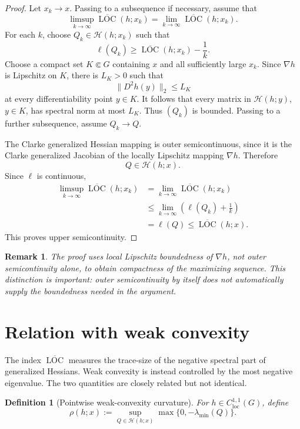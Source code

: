 \documentclass[11pt]{article}
\numberwithin{equation}{section}
\newtheorem{definition}[theorem]{Definition}
\newtheorem{remark}[theorem]{Remark}
\newcommand{\Hess}{\mathcal H}
\newcommand{\LOC}{\operatorname{LOC}}
\begin{document}
	\begin{proof}
		Let \(x_k\to x\). Passing to a subsequence if necessary, assume that
		\[
		\limsup_{k\to\infty}\overline{\LOC}(h;x_k)
		=
		\lim_{k\to\infty}\overline{\LOC}(h;x_k).
		\]
		For each \(k\), choose \(Q_k\in\Hess(h;x_k)\) such that
		\[
		\ell(Q_k)
		\geq
		\overline{\LOC}(h;x_k)-\frac1k.
		\]
		Choose a compact set \(K\Subset G\) containing \(x\) and all sufficiently large \(x_k\). Since \(\nabla h\) is Lipschitz on \(K\), there is \(L_K>0\) such that
		\[
		\|D^2h(y)\|_2\leq L_K
		\]
		at every differentiability point \(y\in K\). It follows that every matrix in \(\Hess(h;y)\), \(y\in K\), has spectral norm at most \(L_K\). Thus \((Q_k)\) is bounded. Passing to a further subsequence, assume \(Q_k\to Q\).
		
		The Clarke generalized Hessian mapping is outer semicontinuous, since it is the Clarke generalized Jacobian of the locally Lipschitz mapping \(\nabla h\). Therefore
		\[
		Q\in\Hess(h;x).
		\]
		Since \(\ell\) is continuous,
		\[
		\begin{aligned}
			\limsup_{k\to\infty}\overline{\LOC}(h;x_k)
			&=
			\lim_{k\to\infty}\overline{\LOC}(h;x_k)  \\
			&\leq
			\lim_{k\to\infty}\left(\ell(Q_k)+\frac1k\right) \\
			&=
			\ell(Q)
			\leq
			\overline{\LOC}(h;x).
		\end{aligned}
		\]
		This proves upper semicontinuity.
	\end{proof}
	
	\begin{remark}
		The proof uses local Lipschitz boundedness of \(\nabla h\), not outer semicontinuity alone, to obtain compactness of the maximizing sequence. This distinction is important: outer semicontinuity by itself does not automatically supply the boundedness needed in the argument.
	\end{remark}
	
	\section{Relation with weak convexity}
	
	The index \(\overline{\LOC}\) measures the trace-size of the negative spectral part of generalized Hessians. Weak convexity is instead controlled by the most negative eigenvalue. The two quantities are closely related but not identical.
	
	\begin{definition}[Pointwise weak-convexity curvature]
		For \(h\in C^{1,1}_{\mathrm{loc}}(G)\), define
		\[
		\rho(h;x)
		:=
		\sup_{Q\in\Hess(h;x)}
		\max\{0,-\lambda_{\min}(Q)\}.
		\]
	\end{definition}
	
\end{document}
